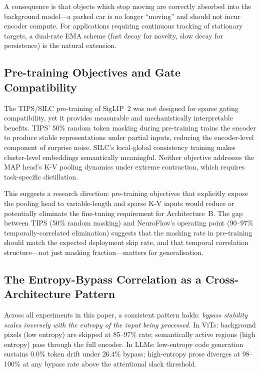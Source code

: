 \documentclass{article}
\begin{document}
A consequence is that objects which stop moving are correctly absorbed
into the background model---a parked car is no longer ``moving'' and
should not incur encoder compute. For applications requiring continuous
tracking of stationary targets, a dual-rate EMA scheme (fast decay for
novelty, slow decay for persistence) is the natural extension.

\subsection{Pre-training Objectives and Gate Compatibility}
\label{sec:pretraining-gate-compatibility}

The TIPS/SILC pre-training of SigLIP~2 was not designed for sparse
gating compatibility, yet it provides measurable and mechanistically
interpretable benefits. TIPS' 50\% random token masking during
pre-training trains the encoder to produce stable representations under
partial inputs, reducing the encoder-level component of surprise noise.
SILC's local-global consistency training makes cluster-level embeddings
semantically meaningful. Neither objective addresses the MAP head's K-V
pooling dynamics under extreme contraction, which requires task-specific
distillation.

This suggests a research direction: pre-training objectives that
explicitly expose the pooling head to variable-length and sparse K-V
inputs would reduce or potentially eliminate the fine-tuning requirement
for Architecture~B. The gap between TIPS (50\% random masking) and
NeuroFlow's operating point (90--97\% temporally-correlated elimination)
suggests that the masking rate in pre-training should match the expected
deployment skip rate, and that temporal correlation structure---not just
masking fraction---matters for generalisation.

\subsection{The Entropy-Bypass Correlation as a Cross-Architecture Pattern}
\label{sec:entropy-bypass-universal}

Across all experiments in this paper, a consistent pattern holds:
\emph{bypass stability scales inversely with the entropy of the input
being processed.} In ViTs: background pixels (low entropy) are skipped
at 85--97\% rate; semantically active regions (high entropy) pass through
the full encoder. In LLMs: low-entropy code generation sustains 0.0\%
token drift under 26.4\% bypass; high-entropy prose diverges at
98--100\% at any bypass rate above the attentional slack threshold.
\end{document}
